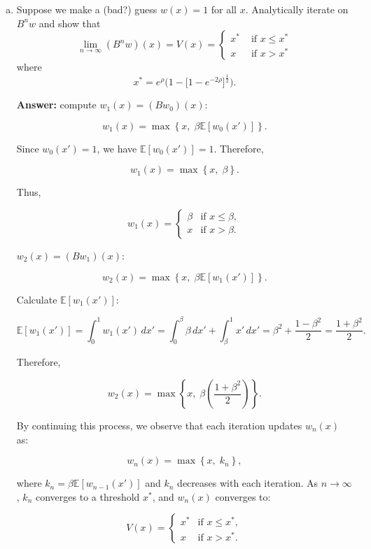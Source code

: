 \documentclass[11pt]{extarticle}
\theoremstyle{plain}
\theoremstyle{definition}
\begin{document}
\begin{enumerate}[(a)]
\item Suppose we make a (bad?) guess $w(x) = 1$ for all $x$. Analytically iterate on $B^n w$ and show that 
\begin{equation*}
	\lim_{n \to \infty} (B^n w) (x) = V(x) = \begin{cases}
		x^* & \text { if } x \leq x^* \\
		x & \text { if } x > x^*
	\end{cases}
\end{equation*}
where
\begin{equation*}
	x^* = e^\rho \bigg( 1 - \Big[ 1 - e^{- 2 \rho} \Big]^\frac{1}{2} \bigg).
\end{equation*}

\textbf{Answer:} compute \( w_1(x) = (B w_0)(x) \):

\[
w_1(x) = \max \left\{ x, \; \beta \mathbb{E}[w_0(x')] \right\}.
\]

Since \( w_0(x') = 1 \), we have \( \mathbb{E}[w_0(x')] = 1 \). Therefore,

\[
w_1(x) = \max \left\{ x, \; \beta \right\}.
\]

Thus,

\[
w_1(x) = \begin{cases}
\beta & \text{if } x \leq \beta, \\
x & \text{if } x > \beta.
\end{cases}
\]

\( w_2(x) = (B w_1)(x) \):

\[
w_2(x) = \max \left\{ x, \; \beta \mathbb{E}[w_1(x')] \right\}.
\]

Calculate \( \mathbb{E}[w_1(x')] \):

\[
\mathbb{E}[w_1(x')] = \int_{0}^{1} w_1(x') \, dx' = \int_{0}^{\beta} \beta \, dx' + \int_{\beta}^{1} x' \, dx' = \beta^2 + \frac{1 - \beta^2}{2} = \frac{1 + \beta^2}{2}.
\]

Therefore,

\[
w_2(x) = \max \left\{ x, \; \beta \left( \frac{1 + \beta^2}{2} \right) \right\}.
\]

By continuing this process, we observe that each iteration updates \( w_n(x) \) as:

\[
w_n(x) = \max \left\{ x, \; k_n \right\},
\]

where \( k_n = \beta \mathbb{E}[w_{n-1}(x')] \) and \( k_n \) decreases with each iteration. As \( n \to \infty \), \( k_n \) converges to a threshold \( x^* \), and \( w_n(x) \) converges to:

\[
V(x) = \begin{cases}
x^* & \text{if } x \leq x^*, \\
x & \text{if } x > x^*.
\end{cases}
\]


\end{enumerate}
\end{document}
